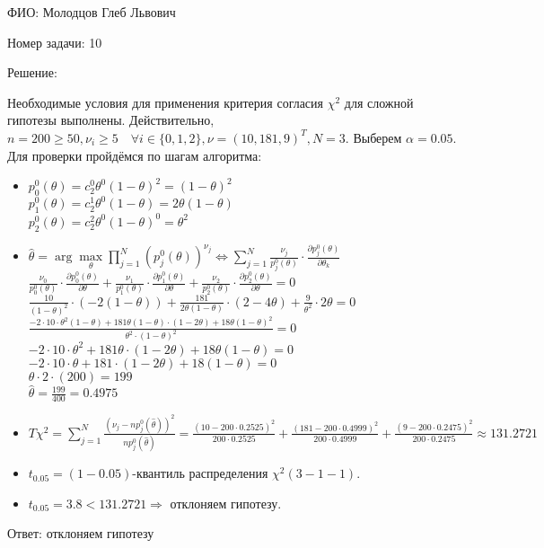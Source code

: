 \documentclass[14pt]{extarticle}
\begin{document}
ФИО: Молодцов Глеб Львович

\vspace{10pt}

Номер задачи: 10

\vspace{10pt}

Решение:

\vspace{10pt}

Необходимые условия для применения критерия согласия $\chi ^2 $ для сложной гипотезы выполнены. Действительно, $n = 200 \geq 50, \nu_i \geq 5 \quad \forall i \in \{0,1,2\}, \nu = \left( 10,181, 9\right)^T, N = 3$. Выберем $\alpha = 0.05$. \\
Для проверки пройдёмся по шагам алгоритма:
\begin{itemize}
    \item $p_0^0(\theta) = c_2^0\theta^0(1-\theta)^2 = (1-\theta)^2$
    \\ $p_1^0(\theta) = c_2^1\theta^0(1-\theta) = 2\theta(1-\theta)$
    \\ $p_2^0(\theta) = c_2^2\theta^0(1-\theta)^0 = \theta^2$
    \item $\hat{\theta} = \arg\underset{\theta}{\max} \prod\limits_{j = 1}^N\left(p_j^0\left(\theta\right)\right)^{\nu_j} \Leftrightarrow \sum\limits_{j=1}^{N}\frac{\nu_j}{p_j^0\left(\theta\right)}\cdot \frac{\partial p_j^0\left(\theta\right)}{\partial\theta_k}$
    \\$\frac{\nu_0}{p_0^0\left(\theta\right)}\cdot \frac{\partial p_0^0\left(\theta\right)}{\partial\theta} + \frac{\nu_1}{p_1^0\left(\theta\right)}\cdot \frac{\partial p_1^0\left(\theta\right)}{\partial\theta} + \frac{\nu_2}{p_2^0\left(\theta\right)}\cdot \frac{\partial p_2^0\left(\theta\right)}{\partial\theta} = 0$ 
    \\ $\frac{10}{(1-\theta)^2}\cdot \left(-2\left(1-\theta\right)\right) + \frac{181}{2\theta(1-\theta)}\cdot (2-4\theta) + \frac{9}{\theta^2}\cdot 2\theta = 0$
    \\ $\frac{-2\cdot 10 \cdot\theta^2(1-\theta) + 181\theta(1-\theta)\cdot(1-2\theta) + 18\theta(1-\theta)^2}{\theta^2\cdot(1-\theta)^2} = 0$
    \\ $- 2 \cdot 10 \cdot\theta^2 + 181\theta\cdot(1-2\theta) + 18\theta(1-\theta) = 0$
    \\ $- 2 \cdot 10 \cdot\theta + 181\cdot(1-2\theta) + 18(1-\theta) = 0$
    \\ $\theta\cdot2\cdot(200) = 199$
    \\ $\hat{\theta} = \frac{199}{400} = 0.4975$
    \item $T\chi^2 = \sum\limits_{j=1}^N\frac{(\nu_j - np_j^0(\hat{\theta}))^2}{np_j^0(\hat{\theta})} = \frac{(10-200\cdot0.2525)^2}{200\cdot0.2525} + \frac{(181-200\cdot0.4999)^2}{200\cdot0.4999} + \frac{(9-200\cdot0.2475)^2}{200\cdot0.2475} \approx 131.2721$
    \item $t_{0.05} = (1-0.05) $-квантиль распределения $\chi^2(3-1-1) $. \item $t_{0.05} =  3.8 < 131.2721 \Rightarrow  $  отклоняем гипотезу.
\end{itemize}

Ответ: отклоняем гипотезу 
\end{document}
